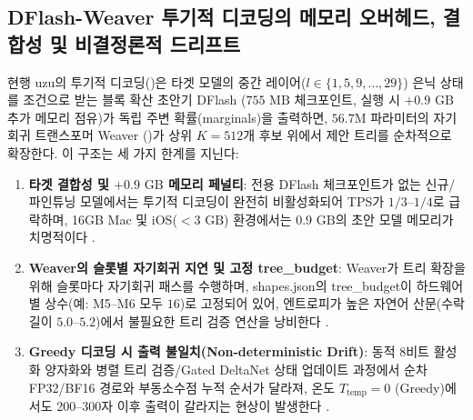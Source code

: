 \documentclass[10pt,a4paper]{article}
\begin{document}
\subsection{\textsf{DFlash-Weaver} 투기적 디코딩의 메모리 오버헤드, 결합성 및 비결정론적 드리프트}
현행 \textsf{uzu}의 투기적 디코딩(\cite{mirai2026specdec,oda2026trees})은 타겟 모델의 중간 레이어($l \in \{1, 5, 9, \dots, 29\}$) 은닉 상태를 조건으로 받는 블록 확산 초안기 \textsf{DFlash} ($755\text{ MB}$ 체크포인트, 실행 시 $+0.9\text{ GB}$ 추가 메모리 점유)가 독립 주변 확률(marginals)을 출력하면, $56.7\text{M}$ 파라미터의 자기회귀 트랜스포머 \textsf{Weaver} (\cite{oda2026trees})가 상위 $K=512$개 후보 위에서 제안 트리를 순차적으로 확장한다. 이 구조는 세 가지 한계를 지닌다:
\begin{enumerate}\setlength{\itemsep}{2pt}\setlength{\parskip}{0pt}
  \item \textbf{타겟 결합성 및 $+0.9\text{ GB}$ 메모리 페널티}: 전용 \textsf{DFlash} 체크포인트가 없는 신규/파인튜닝 모델에서는 투기적 디코딩이 완전히 비활성화되어 TPS가 $1/3\text{--}1/4$로 급락하며, 16GB Mac 및 iOS($<3\text{ GB}$) 환경에서는 $0.9\text{ GB}$의 초안 모델 메모리가 치명적이다 \cite{zenn2026uzu}.
  \item \textbf{\textsf{Weaver}의 슬롯별 자기회귀 지연 및 고정 \textsf{tree\_budget}}: \textsf{Weaver}가 트리 확장을 위해 슬롯마다 자기회귀 패스를 수행하며, \textsf{shapes.json}의 \textsf{tree\_budget}이 하드웨어별 상수(예: M5--M6 모두 $16$)로 고정되어 있어, 엔트로피가 높은 자연어 산문(수락 길이 $5.0\text{--}5.2$)에서 불필요한 트리 검증 연산을 낭비한다 \cite{liu2026sparsespec,rusanovsky2026lilicorr}.
  \item \textbf{Greedy 디코딩 시 출력 불일치(Non-deterministic Drift)}: 동적 8비트 활성화 양자화와 병렬 트리 검증/Gated DeltaNet 상태 업데이트 과정에서 순차 FP32/BF16 경로와 부동소수점 누적 순서가 달라져, 온도 $T_{\text{temp}}=0$ (Greedy)에서도 200--300자 이후 출력이 갈라지는 현상이 발생한다 \cite{zenn2026uzu,ma2026gdntreescan,panferov2026dq}.
\end{enumerate}
\end{document}
